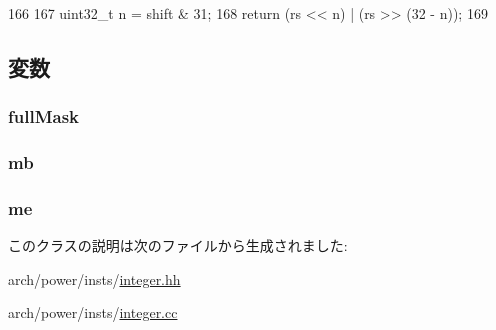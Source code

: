 \begin{DoxyCode}
166     {
167         uint32_t n = shift & 31;
168         return (rs << n) | (rs >> (32 - n));
169     }
\end{DoxyCode}


\subsection{変数}
\hypertarget{classPowerISA_1_1IntRotateOp_aa713b7e82b23f1283790e4f19b5606dc}{
\subsubsection[{fullMask}]{ {\bf fullMask}}}
\label{classPowerISA_1_1IntRotateOp_aa713b7e82b23f1283790e4f19b5606dc}
\hypertarget{classPowerISA_1_1IntRotateOp_a3e190bd2b8ef0f37555b4d70d783b479}{
\subsubsection[{mb}]{ {\bf mb}}}
\label{classPowerISA_1_1IntRotateOp_a3e190bd2b8ef0f37555b4d70d783b479}
\hypertarget{classPowerISA_1_1IntRotateOp_aa54fd7dc50062b9688eb7e2df5e520f0}{
\subsubsection[{me}]{ {\bf me}}}
\label{classPowerISA_1_1IntRotateOp_aa54fd7dc50062b9688eb7e2df5e520f0}


このクラスの説明は次のファイルから生成されました:\begin{DoxyCompactItemize}
\item 
arch/power/insts/\hyperlink{integer_8hh}{integer.hh}\item 
arch/power/insts/\hyperlink{integer_8cc}{integer.cc}\end{DoxyCompactItemize}
